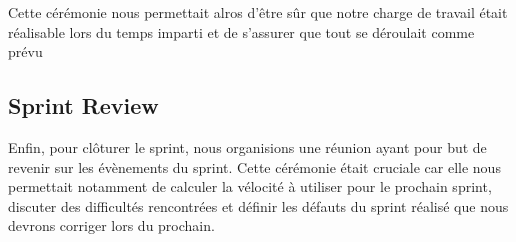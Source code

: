 \documentclass[11pt]{report}
\begin{document}
Cette cérémonie nous permettait alros d'être sûr que notre charge de travail était réalisable lors du temps imparti
et de s'assurer que tout se déroulait comme prévu

\subsection{Sprint Review}

Enfin, pour clôturer le sprint, nous organisions une réunion ayant pour but de revenir sur les évènements du sprint.
Cette cérémonie était cruciale car elle nous permettait notamment de calculer la vélocité à utiliser pour le prochain sprint,
discuter des difficultés rencontrées et définir les défauts du sprint réalisé que nous devrons corriger lors du prochain.
\end{document}
